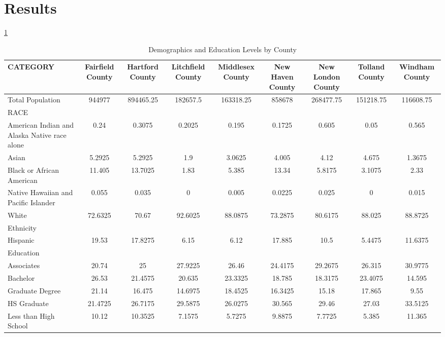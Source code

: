 \documentclass[12pt]{article}
\begin{document}
\section{Results}\label{sec:resu}

\ref{tab:connecticut-counties}

\begin{table}[h]
    \centering
    \caption{Demographics and Education Levels by County} \label{tab:connecticut-counties}
    \begin{tabular}{l|cccccccc}
    \hline
    \textbf{CATEGORY} & \textbf{Fairfield County} & \textbf{Hartford County} & \textbf{Litchfield County} & \textbf{Middlesex County} & \textbf{New Haven County} & \textbf{New London County} & \textbf{Tolland County} & \textbf{Windham County} \\ \hline
    Total Population & 944977 & 894465.25 & 182657.5 & 163318.25 & 858678 & 268477.75 & 151218.75 & 116608.75 \\
    RACE &  &  &  &  &  &  &  &  \\
    American Indian and Alaska Native race alone & 0.24 & 0.3075 & 0.2025 & 0.195 & 0.1725 & 0.605 & 0.05 & 0.565 \\
    Asian & 5.2925 & 5.2925 & 1.9 & 3.0625 & 4.005 & 4.12 & 4.675 & 1.3675 \\
    Black or African American & 11.405 & 13.7025 & 1.83 & 5.385 & 13.34 & 5.8175 & 3.1075 & 2.33 \\
    Native Hawaiian and Pacific Islander & 0.055 & 0.035 & 0 & 0.005 & 0.0225 & 0.025 & 0 & 0.015 \\
    White & 72.6325 & 70.67 & 92.6025 & 88.0875 & 73.2875 & 80.6175 & 88.025 & 88.8725 \\
    Ethnicity &  &  &  &  &  &  &  &  \\
    Hispanic & 19.53 & 17.8275 & 6.15 & 6.12 & 17.885 & 10.5 & 5.4475 & 11.6375 \\
    Education &  &  &  &  &  &  &  &  \\
    Associates & 20.74 & 25 & 27.9225 & 26.46 & 24.4175 & 29.2675 & 26.315 & 30.9775 \\
    Bachelor & 26.53 & 21.4575 & 20.635 & 23.3325 & 18.785 & 18.3175 & 23.4075 & 14.595 \\
    Graduate Degree & 21.14 & 16.475 & 14.6975 & 18.4525 & 16.3425 & 15.18 & 17.865 & 9.55 \\
    HS Graduate & 21.4725 & 26.7175 & 29.5875 & 26.0275 & 30.565 & 29.46 & 27.03 & 33.5125 \\
    Less than High School & 10.12 & 10.3525 & 7.1575 & 5.7275 & 9.8875 & 7.7725 & 5.385 & 11.365 \\ \hline
    \end{tabular}
    \end{table}    
\end{document}
